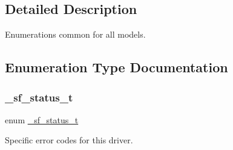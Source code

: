 \subsection{Detailed Description}
Enumerations common for all models. 

\subsection{Enumeration Type Documentation}
\mbox{\label{group__sf__enum__group_ga1b29c7c81b1098654855dd013cb61b56}} 
\subsubsection{\texorpdfstring{\_sf\_status\_t}{\_sf\_status\_t}}
{\footnotesize\ttfamily enum \mbox{\hyperlink{group__sf__enum__group_ga1b29c7c81b1098654855dd013cb61b56}{\+\_\+sf\+\_\+status\+\_\+t}}}



Specific error codes for this driver. 

